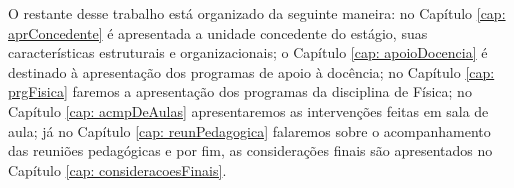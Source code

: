 O restante desse trabalho está organizado da seguinte maneira: no Capítulo \ref{cap: aprConcedente} é apresentada a unidade concedente do estágio, suas características estruturais e organizacionais; o Capítulo \ref{cap: apoioDocencia} é destinado à apresentação dos programas de apoio à docência; no Capítulo \ref{cap: prgFisica} faremos a apresentação dos programas da disciplina de Física; no Capítulo \ref{cap: acmpDeAulas} apresentaremos as intervenções feitas em sala de aula; já no Capítulo \ref{cap: reunPedagogica} falaremos sobre o acompanhamento das reuniões pedagógicas e por fim, as considerações finais são apresentados no Capítulo \ref{cap: consideracoesFinais}.




	